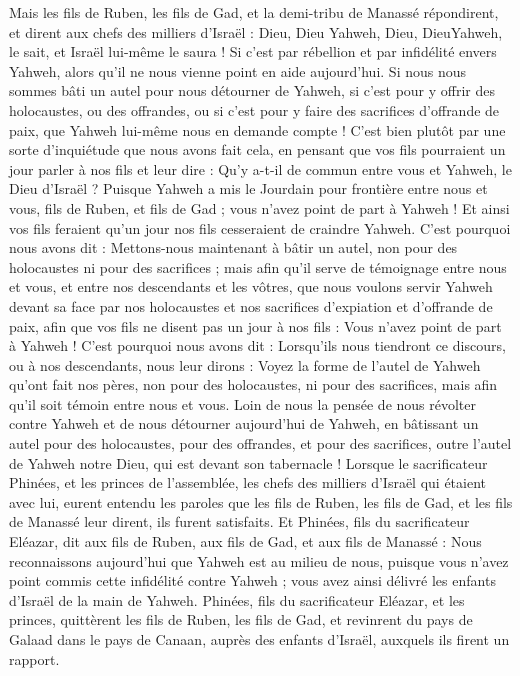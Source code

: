 \begin{multicols}{2}
Mais les fils de Ruben, les fils de Gad, et la demi-tribu de Manassé répondirent, et dirent aux chefs des milliers d’Israël :
Dieu\FTNT{}, Dieu\FTNT{} Yahweh, Dieu\FTNT{}, Dieu\FTNT{}Yahweh, le sait, et Israël lui-même le saura ! Si c’est par rébellion et par infidélité envers Yahweh, alors qu’il ne nous vienne point en aide aujourd’hui.
Si nous nous sommes bâti un autel pour nous détourner de Yahweh, si c’est pour y offrir des holocaustes, ou des offrandes, ou si c’est pour y faire des sacrifices d’offrande de paix, que Yahweh lui-même nous en demande compte !
C’est bien plutôt par une sorte d’inquiétude que nous avons fait cela, en pensant que vos fils pourraient un jour parler à nos fils et leur dire : Qu’y a-t-il de commun entre vous et Yahweh, le Dieu d’Israël ?
Puisque Yahweh a mis le Jourdain pour frontière entre nous et vous, fils de Ruben, et fils de Gad ; vous n’avez point de part à Yahweh ! Et ainsi vos fils feraient qu’un jour nos fils cesseraient de craindre Yahweh.
C’est pourquoi nous avons dit : Mettons-nous maintenant à bâtir un autel, non pour des holocaustes ni pour des sacrifices ;
mais afin qu’il serve de témoignage entre nous et vous, et entre nos descendants et les vôtres, que nous voulons servir Yahweh devant sa face par nos holocaustes et nos sacrifices d’expiation et d’offrande de paix, afin que vos fils ne disent pas un jour à nos fils : Vous n’avez point de part à Yahweh !
C’est pourquoi nous avons dit : Lorsqu’ils nous tiendront ce discours, ou à nos descendants, nous leur dirons : Voyez la forme de l’autel de Yahweh qu’ont fait nos pères, non pour des holocaustes, ni pour des sacrifices, mais afin qu’il soit témoin entre nous et vous.
Loin de nous la pensée de nous révolter contre Yahweh et de nous détourner aujourd’hui de Yahweh, en bâtissant un autel pour des holocaustes, pour des offrandes, et pour des sacrifices, outre l’autel de Yahweh notre Dieu, qui est devant son tabernacle !
Lorsque le sacrificateur Phinées, et les princes de l’assemblée, les chefs des milliers d’Israël qui étaient avec lui, eurent entendu les paroles que les fils de Ruben, les fils de Gad, et les fils de Manassé leur dirent, ils furent satisfaits.
Et Phinées, fils du sacrificateur Eléazar, dit aux fils de Ruben, aux fils de Gad, et aux fils de Manassé : Nous reconnaissons aujourd’hui que Yahweh est au milieu de nous, puisque vous n’avez point commis cette infidélité contre Yahweh ; vous avez ainsi délivré les enfants d’Israël de la main de Yahweh.
Phinées, fils du sacrificateur Eléazar, et les princes, quittèrent les fils de Ruben, les fils de Gad, et revinrent du pays de Galaad dans le pays de Canaan, auprès des enfants d’Israël, auxquels ils firent un rapport.

\end{multicols}
